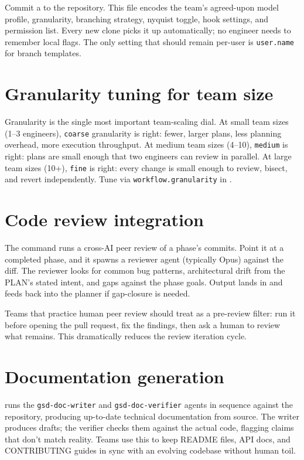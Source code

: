 \documentclass[11pt,letterpaper,openany]{book}
\begin{document}
Commit a  to the repository. This file encodes the team's agreed-upon model profile, granularity, branching strategy, nyquist toggle, hook settings, and permission list. Every new clone picks it up automatically; no engineer needs to remember local flags. The only setting that should remain per-user is \texttt{user.name} for branch templates.

\section{Granularity tuning for team size}

Granularity is the single most important team-scaling dial. At small team sizes (1--3 engineers), \texttt{coarse} granularity is right: fewer, larger plans, less planning overhead, more execution throughput. At medium team sizes (4--10), \texttt{medium} is right: plans are small enough that two engineers can review in parallel. At large team sizes (10+), \texttt{fine} is right: every change is small enough to review, bisect, and revert independently. Tune via \texttt{workflow.granularity} in .

\section{Code review integration}

The  command runs a cross-AI peer review of a phase's commits. Point it at a completed phase, and it spawns a reviewer agent (typically Opus) against the diff. The reviewer looks for common bug patterns, architectural drift from the PLAN's stated intent, and gaps against the phase goals. Output lands in  and feeds back into the planner if gap-closure is needed.

Teams that practice human peer review should treat  as a pre-review filter: run it before opening the pull request, fix the findings, then ask a human to review what remains. This dramatically reduces the review iteration cycle.

\section{Documentation generation}

 runs the \texttt{gsd-doc-writer} and \texttt{gsd-doc-verifier} agents in sequence against the repository, producing up-to-date technical documentation from source. The writer produces drafts; the verifier checks them against the actual code, flagging claims that don't match reality. Teams use this to keep README files, API docs, and CONTRIBUTING guides in sync with an evolving codebase without human toil.
\end{document}
